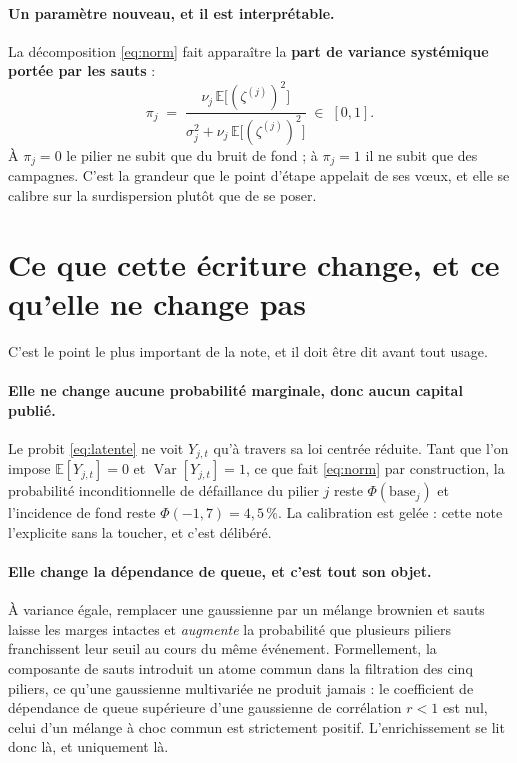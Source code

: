 \documentclass[11pt,a4paper]{article}
\newcommand{\Var}{\operatorname{Var}}
\newcommand{\E}{\mathbb{E}}
\begin{document}
\paragraph{Un paramètre nouveau, et il est interprétable.} La décomposition
\eqref{eq:norm} fait apparaître la \textbf{part de variance systémique portée par les
sauts} :
\begin{equation}
\label{eq:pi}
  \pi_j \;=\; \frac{\nu_j\,\E\big[(\zeta^{(j)})^2\big]}
                   {\sigma_j^2 + \nu_j\,\E\big[(\zeta^{(j)})^2\big]}
  \;\in\; [0,1].
\end{equation}
À $\pi_j = 0$ le pilier ne subit que du bruit de fond ; à $\pi_j = 1$ il ne subit que des
campagnes. C'est la grandeur que le point d'étape appelait de ses vœux, et elle se calibre
sur la surdispersion plutôt que de se poser.

\section{Ce que cette écriture change, et ce qu'elle ne change pas}

C'est le point le plus important de la note, et il doit être dit avant tout usage.

\paragraph{Elle ne change aucune probabilité marginale, donc aucun capital publié.} Le
probit \eqref{eq:latente} ne voit $Y_{j,t}$ qu'à travers sa loi centrée réduite. Tant que
l'on impose $\E[Y_{j,t}] = 0$ et $\Var[Y_{j,t}] = 1$, ce que fait \eqref{eq:norm} par
construction, la probabilité inconditionnelle de défaillance du pilier $j$ reste
$\Phi(\text{base}_j)$ et l'incidence de fond reste $\Phi(-1{,}7) = 4{,}5\,\%$. La
calibration est gelée : cette note l'explicite sans la toucher, et c'est délibéré.

\paragraph{Elle change la dépendance de queue, et c'est tout son objet.} À variance égale,
remplacer une gaussienne par un mélange brownien et sauts laisse les marges intactes et
\emph{augmente} la probabilité que plusieurs piliers franchissent leur seuil au cours du
même événement. Formellement, la composante de sauts introduit un atome commun dans la
filtration des cinq piliers, ce qu'une gaussienne multivariée ne produit jamais : le
coefficient de dépendance de queue supérieure d'une gaussienne de corrélation $r < 1$ est
nul, celui d'un mélange à choc commun est strictement positif. L'enrichissement se lit donc
là, et uniquement là.
\end{document}
